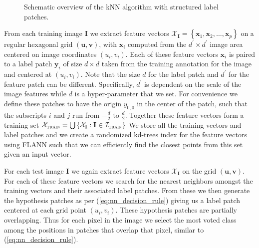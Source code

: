 \documentclass[a4paper,titlepage]{article}
\renewcommand{\vec}[1]{\mathbf{#1}}
\newcommand{\mat}[1]{\mathbf{#1}}
\begin{document}
\begin{figure}[tbh]
\begin{center}
\caption{Schematic overview of the \ac{kNN} algorithm with structured label patches. }
\label{fig:knn_segmentation}
\end{center}
\end{figure}

From each training image $\mat{I}$ we extract feature vectors $\mathcal{X}_\mat{I} = \left\{ \vec{x}_1, \vec{x}_2, \ldots, \vec{x}_p \right\}$ on a regular hexagonal grid $(\vec{u}, \vec{v})$, with $\vec{x}_i$ computed from the $d^\prime \times d^\prime$ image area centered on image coordinates $(u_i, v_i)$. Each of these feature vectors $\vec{x}_i$ is paired to a label patch $\vec{y}_i$ of size $d \times d$ taken from the training annotation for the image and centered at $(u_i, v_i)$. Note that the size $d$ for the label patch and $d^\prime$ for the feature patch can be different. Specifically, $d^\prime$ is dependent on the scale of the image features while $d$ is a hyper-parameter that we set. For convenience we define these patches to have the origin $y_{0,0}$ in the center of the patch, such that the subscripts $i$ and $j$ run from $-\tfrac{d}{2}$ to $\tfrac{d}{2}$. Together these feature vectors form a training set $\mathcal{X}_\textsc{train} = \bigcup\left\{\mathcal{X}_\mat{I}: \mat{I} \in \mathcal{I}_\textsc{train} \right\}$ We store all the training vectors and label patches and we create a randomized kd-trees index for the feature vectors using FLANN \cite{muja2009fast} such that we can efficiently find the closest points from this set given an input vector.

For each test image $\mat{I}$ we again extract feature vectors $\mathcal{X}_\mat{I}$ on the grid $(\vec{u}, \vec{v})$. For each of these feature vectors we search for the nearest neighbors amongst the training vectors and their associated label patches. From these we then generate the hypothesis patches as per (\ref{eq:nn_decision_rule}) giving us a label patch centered at each grid point $(u_i, v_i)$. These hypothesis patches are partially overlapping. Thus for each pixel in the image we select the most voted class among the positions in patches that overlap that pixel, similar to (\ref{eq:nn_decision_rule}).
\end{document}
